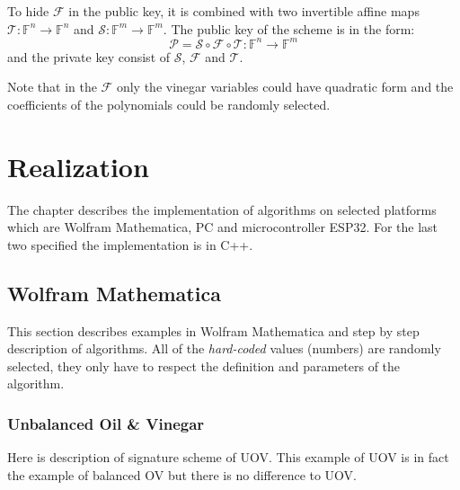 \documentclass[thesis=M,english]{FITthesis}[2019/12/23]
\begin{document}
\bigskip
\noindent
To hide $\mathcal{F}$ in the public key, it is combined with two invertible affine maps $\mathcal{T}: \mathbb{F}^n \rightarrow \mathbb{F}^n$ and $\mathcal{S}: \mathbb{F}^m \rightarrow \mathbb{F}^m$. The public key of the scheme is in the form:
\[
	\mathcal{P} = \mathcal{S} \circ \mathcal{F} \circ \mathcal{T} : \mathbb{F}^n \rightarrow \mathbb{F}^m
\]
and the private key consist of $\mathcal{S}$, $\mathcal{F}$ and $\mathcal{T}$.

\bigskip
\noindent
Note that in the $\mathcal{F}$ only the vinegar variables could have quadratic form and the coefficients of the polynomials could be randomly selected.

\chapter{Realization}
The chapter describes the implementation of algorithms on selected platforms which are Wolfram Mathematica, PC and microcontroller ESP32. For the last two specified the implementation is in C++.

\section{Wolfram Mathematica}
This section describes examples in Wolfram Mathematica and step by step description of algorithms. All of the \textit{hard-coded} values (numbers) are randomly selected, they only have to respect the definition and parameters of the algorithm.  

\subsection{Unbalanced Oil \& Vinegar}
Here is description of signature scheme of UOV. This example of UOV is in fact the example of balanced OV but there is no difference to UOV.
\end{document}
